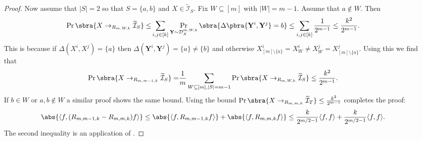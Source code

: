 \begin{proof}
    Now assume that $|S|=2$ so that $S=\{a,b\}$ and $X\in\widetilde{\mathcal{I}}_S$. Fix $W\subseteq[m]$ with $|W|=m-1$. Assume that $a\not\in W$. Then
    \begin{align*}
        \Pr\sbra{X\to_{R_{m,W,k}} \widetilde{\mathcal{I}}_S}\leq&\sum_{i,j\in[k]}\Pr_{\mathbf{Y}\sim\mathcal{D}^{m,W,k}_X}\sbra{\Delta\pbra{\mathbf{Y}^i,\mathbf{Y}^j}=b}\leq\sum_{i,j\in[k]}\frac{1}{2^{m-1}}\leq \frac{k^2}{2^{m-1}}.
    \end{align*}
    This is because if $\Delta(X^i,X^j)=\{a\}$ then $\Delta(\mathbf{Y}^i,\mathbf{Y}^j)=\{a\}\neq \{b\}$ and otherwise $X^i_{[m]\setminus\{a\}}=X^i_W \neq X^j_W= X^j_{[m]\setminus\{a\}}$. Using this we find that
    \begin{align*}
        \Pr\sbra{X\to_{R_{m,m-1,k}} \widetilde{\mathcal{I}}_S}=&\frac1m\sum_{W\subseteq[m],|S|=m-1}\Pr\sbra{X\to_{R_{m,W,k}} \widetilde{\mathcal{I}}_S}\leq \frac{k^2}{2^{m-1}}.
    \end{align*}
    If $b\in W$ or $a,b\not\in W$ a similar proof shows the same bound. Using the bound $\Pr\sbra{X\to_{R_{m,m,k}} \widetilde{\mathcal{I}}_T}\leq \frac{k^2}{2^{m-1}}$ completes the proof:
    \begin{align*}
        &\abs{\left\langle f,(R_{m,m-1,k}-R_{m,m,k})f\right\rangle}
        \leq\abs{\left\langle f,R_{m,m-1,k}f\right\rangle}+\abs{\left\langle f,R_{m,m,k}f\right\rangle}
        \leq\frac{k}{2^{m/2-1}}\langle f,f\rangle+ \frac{k}{2^{m/2-1}}\langle f,f\rangle.
    \end{align*}
    The second inequality is an application of .
\end{proof}

